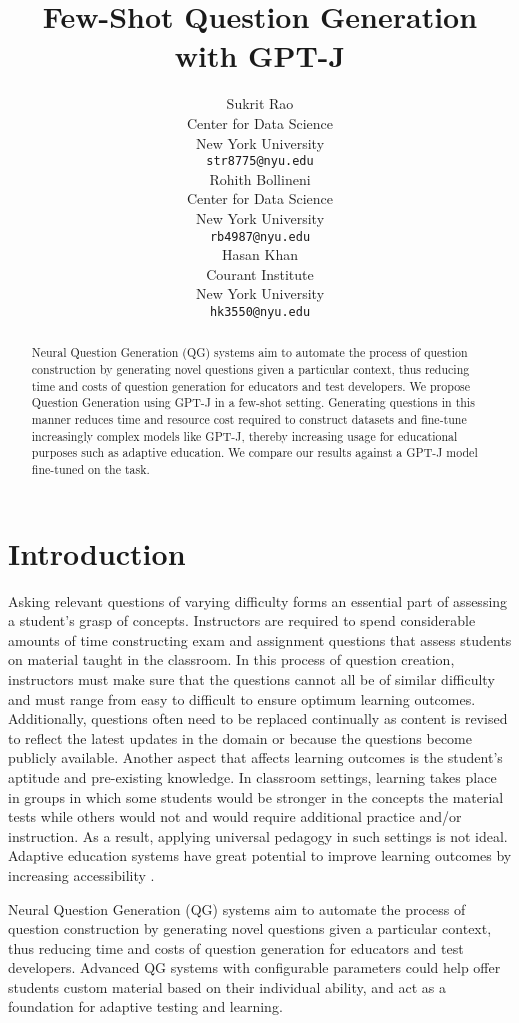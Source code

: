 \documentclass[11pt]{article}
\title{Few-Shot Question Generation with GPT-J}
\author{Sukrit Rao \\
  Center for Data Science \\
  New York University \\
  \texttt{str8775@nyu.edu} \\\And
  Rohith Bollineni \\
  Center for Data Science \\
  New York University \\
  \texttt{rb4987@nyu.edu} \\\And
  Hasan Khan \\
  Courant Institute \\ 
  New York University \\
  \texttt{hk3550@nyu.edu} \\}
\begin{document}
\maketitle
\begin{abstract}
Neural Question Generation (QG) systems aim to automate the process of question construction by generating novel questions given a particular context, thus reducing time and costs of question generation for educators and test developers. We propose Question Generation using GPT-J in a few-shot setting. Generating questions in this manner reduces time and resource cost required to construct datasets and fine-tune increasingly complex models like GPT-J, thereby increasing usage for educational purposes such as adaptive education. We compare our results against a GPT-J model fine-tuned on the task. 
\end{abstract}

\section{Introduction}

Asking relevant questions of varying difficulty forms an essential part of assessing a student’s grasp of concepts. Instructors are required to spend considerable amounts of time constructing exam and assignment questions that assess students on material taught in the classroom.
In this process of question creation, instructors must make sure that the questions cannot all be of similar difficulty and must range from easy to difficult to ensure optimum learning outcomes. Additionally, questions often need to be replaced continually as content is revised to reflect the latest updates in the domain or because the questions become publicly available. Another aspect that affects learning outcomes is the student's aptitude and pre-existing knowledge. In classroom settings, learning takes place in groups in which some students would be stronger in the concepts the material tests while others would not and would require additional practice and/or instruction. As a result, applying universal pedagogy in such settings is not ideal. \citep{personalized-learning:9}  Adaptive education systems have great potential to improve learning outcomes by increasing accessibility \citep{adaptive-education:8}. 

Neural Question Generation (QG)  \citep{question-generation:10} systems aim to automate the process of question construction by generating novel questions given a particular context, thus reducing time and costs of question generation for educators and test developers. Advanced QG systems with configurable parameters could help offer students custom material based on their individual ability, and act as a foundation for adaptive testing and learning. 
\end{document}
